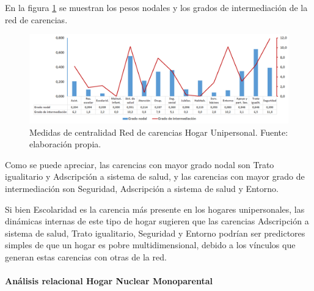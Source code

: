 \documentclass[12pt,letterpaper,spanish]{article}
\begin{document}
En la figura \ref{CenUni} se muestran los pesos nodales y los grados de intermediación de la red de carencias.
\begin{figure}[H]
    \centering
    \includegraphics[width=\textwidth]{Grafos/nc_unipersonal.png}
    \caption{Medidas de centralidad Red de carencias Hogar Unipersonal. Fuente: elaboración propia.}
    \label{CenUni}
\end{figure}
Como se puede apreciar, las carencias con mayor grado nodal son Trato igualitario y Adscripción a sistema de salud, y las carencias con mayor grado de intermediación son Seguridad, Adscripción a sistema de salud y Entorno. 

Si bien Escolaridad es la carencia más presente en los hogares unipersonales, las dinámicas internas de este tipo de hogar sugieren que las carencias Adscripción a sistema de salud, Trato igualitario, Seguridad y Entorno podrían ser predictores simples de que un hogar es pobre multidimensional, debido a los vínculos que generan estas carencias con otras de la red. 

\paragraph{Análisis relacional Hogar Nuclear Monoparental }
\end{document}
